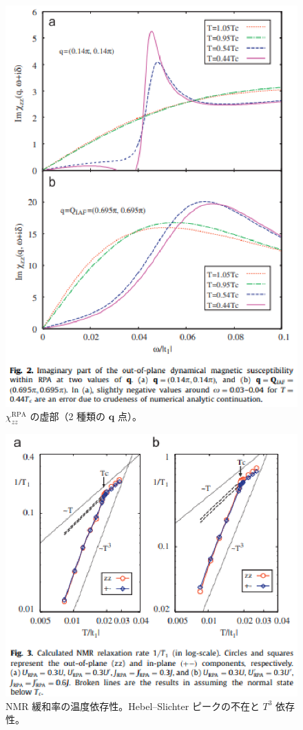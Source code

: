 \documentclass[a4paper,11pt]{jsarticle}
\begin{document}
\begin{figure}[htbp]
  \centering
  \includegraphics[width=\textwidth]{image-18.eps}
  \caption{$\chi_{zz}^{\mathrm{RPA}}$ の虚部（2 種類の $\bm{q}$ 点）。}
\end{figure}

\begin{figure}[htbp]
  \centering
  \includegraphics[width=\textwidth]{image-19.eps}
  \caption{NMR 緩和率の温度依存性。Hebel–Slichter ピークの不在と $T^3$ 依存性。}
\end{figure}
\end{document}
